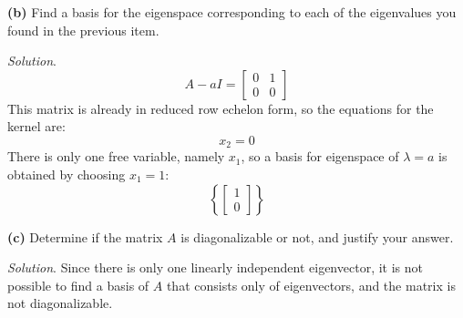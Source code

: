 \documentclass[12pt]{article}
\begin{document}
\textbf{(b)} Find a basis for the eigenspace corresponding to each of the eigenvalues you found in the previous item.

\emph{Solution}.
\[
A-aI=\begin{bmatrix}0&1\\0&0\end{bmatrix}
\]
This matrix is already in reduced row echelon form, so the equations for the kernel are:
\[
x_2=0
\]
There is only one free variable, namely $x_1$, so a basis for eigenspace of $\lambda=a$ is obtained by choosing $x_1=1$:
\[
\left\{\begin{bmatrix}1\\0\end{bmatrix}\right\}
\]
\proofend

\textbf{(c)} Determine if the matrix $A$ is diagonalizable or not, and justify your answer.

\emph{Solution}. Since there is only one linearly independent eigenvector, it is not possible to find a basis of $A$ that consists only of eigenvectors, and the matrix is not diagonalizable.\proofend
\end{document}
